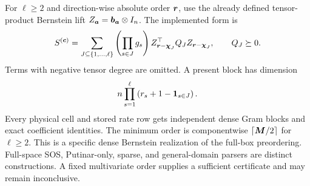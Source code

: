 For $\ell\ge2$ and direction-wise absolute order $\boldsymbol{r}$, use the already defined tensor-product Bernstein lift $Z_{\boldsymbol{a}}=\boldsymbol{b}_{\boldsymbol{a}}\otimes I_n$. The implemented form is
\begin{gather*}
  S^{(\boldsymbol{c})}=
  \sum_{J\subseteq\{1,\ldots,\ell\}}
  \left(\prod_{s\in J}g_s\right)
  Z_{\boldsymbol{r}-\boldsymbol{\chi}_J}^\top
  Q_J
  Z_{\boldsymbol{r}-\boldsymbol{\chi}_J},
  \qquad Q_J\succeq0.
\end{gather*}
Terms with negative tensor degree are omitted.  A present block has dimension
\begin{gather*}
  n\prod_{s=1}^{\ell}\left(r_s+1-\boldsymbol{1}_{s\in J}\right).
\end{gather*}
Every physical cell and stored rate row gets independent dense Gram blocks and exact coefficient identities. The minimum order is componentwise $\lceil\boldsymbol{M}/2\rceil$ for $\ell\ge2$. This is a specific dense Bernstein realization of the full-box preordering. Full-space SOS, Putinar-only, sparse, and general-domain parsers are distinct constructions. A fixed multivariate order supplies a sufficient certificate and may remain inconclusive.

